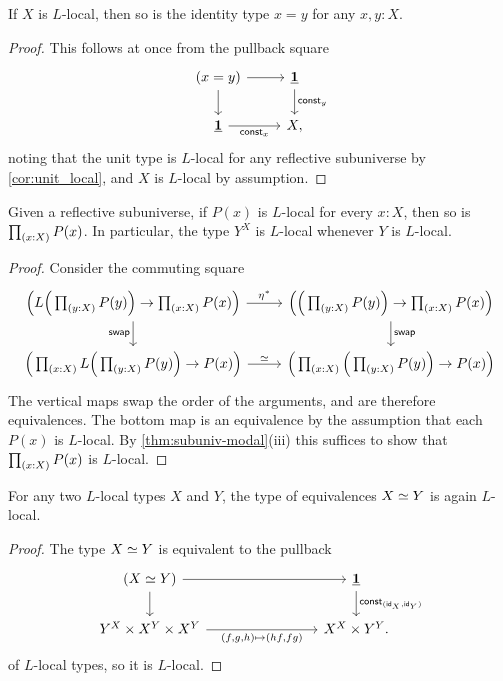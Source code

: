 \begin{cor}\label{lem:rs_idstable}
If $X$ is $L$-local, then so is the identity type $x=y$ for any $x,y:X$.
\end{cor}

\begin{proof}
This follows at once from the pullback square
\begin{equation*}
\begin{tikzcd}
(x=y) \arrow[d] \arrow[r] & \unit \arrow[d,"\mathsf{const}_y"] \\
\unit \arrow[r,swap,"\mathsf{const}_x"] & X,
\end{tikzcd}
\end{equation*}
noting that the unit type is $L$-local for any reflective subuniverse by \cref{cor:unit_local}, and $X$ is $L$-local by assumption.
\end{proof}

\begin{prp}\label{lem:modal-Pi}
Given a reflective subuniverse,
if $P(x)$ is $L$-local for every $x:X$, then so is $\prd{x:X}P(x)$. In particular, the type $Y^X$ is $L$-local whenever $Y$ is $L$-local.
\end{prp}

\begin{proof}
Consider the commuting square
\begin{equation*}
\begin{tikzcd}
\Big(L\Big(\prd{y:X}P(y)\Big)\to \prd{x:X}P(x)\Big) \arrow[r,"\precomp{\modalunit}"] \arrow[d,swap,"\mathsf{swap}"] & \Big(\Big(\prd{y:X}P(y)\Big)\to \prd{x:X}P(x)\Big) \arrow[d,"\mathsf{swap}"] \\
\Big(\prd{x:X} L\Big(\prd{y:X}P(y)\Big)\to P(x)\Big) \arrow[r,"\eqvsym"] & \Big(\prd{x:X}\Big(\prd{y:X}P(y)\Big)\to P(x)\Big)
\end{tikzcd}
\end{equation*}
The vertical maps swap the order of the arguments, and are therefore equivalences. The bottom map is an equivalence by the assumption that each $P(x)$ is $L$-local. By \cref{thm:subuniv-modal}(iii) this suffices to show that $\prd{x:X}P(x)$ is $L$-local.
\end{proof}

\begin{cor}\label{cor:local_equiv}
For any two $L$-local types $X$ and $Y$, the type of equivalences $\eqv{X}{Y}$ is again $L$-local.
\end{cor}

\begin{proof}
The type $\eqv{X}{Y}$ is equivalent to the pullback
  \[
    \begin{tikzcd}[column sep=8em]
      (\eqv{X}{Y}) \arrow[r] \arrow[d] & \unit \arrow[d,"\mathsf{const}_{(\idfunc[X],\idfunc[Y])}"] \\
      Y^X\times X^Y\times X^Y
         \arrow[r,swap,"{(f,g,h) \mapsto (hf,fg)}"] & X^X\times Y^Y.
    \end{tikzcd}
  \]
  of $L$-local types, so it is $L$-local.
\end{proof}

